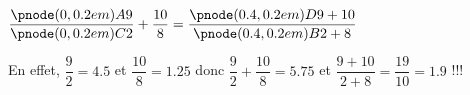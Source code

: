 \begin{changemargin}{0mm}{-15mm}
   \begin{remarque}

      $\dfrac{\pnode(0,0.2em){A}{9}}{\pnode(0,0.2em){C}{2}}+\dfrac{10}{8}=\dfrac{\pnode(0.4,0.2em){D}{9+10}}{\pnode(0.4,0.2em){B}{2+8}}$ 

      \smallskip
      En effet, $\dfrac{9}{2}=\num{4.5}$ et $\dfrac{10}{8}=\num{1.25}$ donc $\dfrac{9}{2}+\dfrac{10}{8}=\num{5.75}$ et $\dfrac{9+10}{2+8}=\dfrac{19}{10}=\num{1.9}$ !!!
   \end{remarque}
\end{changemargin}
 
